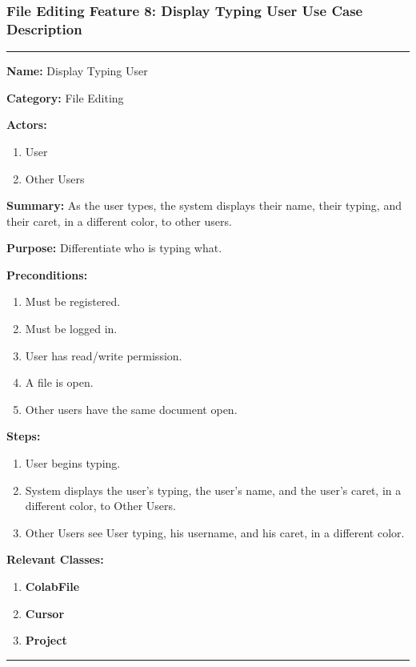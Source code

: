\documentclass[twoside,letterpaper]{article}
\begin{document}
	
	\subsubsection[File Editing Feature 8: Display Typing User]{\rmfamily\bfseries\color{black}
		File Editing Feature 8: Display Typing User Use Case Description}
	\hypertarget{RefHeading22059017292}{}
	
	\vspace{2pt}
	\hrule
	\vspace{8pt}
		\noindent\textbf{Name:} Display Typing User \newline
		
		\noindent\textbf{Category:} File Editing \newline
		
		\noindent\textbf{Actors:} 
		\begin{enumerate}
			\item User
			\item Other Users
		\end{enumerate}
		\noindent\textbf{Summary:} As the user types, the system displays their name, their typing, and their caret, in a different color, to other users. \newline
		
		\noindent\textbf{Purpose:} Differentiate who is typing what. \newline
		
		\noindent\textbf{Preconditions:}
		\begin{enumerate}
			\item Must be registered.
			\item Must be logged in.
			\item User has read/write permission.
			\item A file is open.
			\item Other users have the same document open.
		\end{enumerate}
		\noindent\textbf{Steps:}
		\begin{enumerate}
			\item User begins typing.
			\item System displays the user's typing, the user's name, and the user's caret, in a different color, to Other Users.
			\item Other Users see User typing, his username, and his caret, in a different color.
		\end{enumerate}
		\noindent\textbf{Relevant Classes:}
		\begin{enumerate}
		   \item \textbf {ColabFile}
		   \item \textbf {Cursor}
		   \item \textbf {Project}
		\end{enumerate}
	\vspace{8pt}
	\hrule
	\newpage
	
\end{document}
